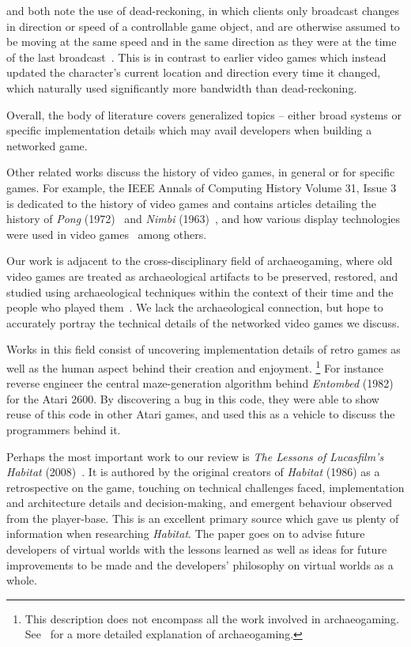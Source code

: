 \citet{Das1997NetEffect} and \citet{Blau1992NetworkedEnvironments} both note the use of dead-reckoning, in which clients only broadcast changes in direction or speed of a controllable game object, and are otherwise assumed to be moving at the same speed and in the same direction as they were at the time of the last broadcast~\cite{Blau1992NetworkedEnvironments}. This is in contrast to earlier video games which instead updated the character's current location and direction every time it changed, which naturally used significantly more bandwidth than dead-reckoning.

Overall, the body of literature covers generalized topics -- either broad systems or specific implementation details which may avail developers when building a networked game.

Other related works discuss the history of video games, in general or for specific games. For example, the IEEE Annals of Computing History Volume 31, Issue 3 is dedicated to the history of video games and contains articles detailing the history of \textit{Pong} (1972)~\cite{lowood} and \textit{Nimbi} (1963)~\cite{jorgensen}, and how various display technologies were used in video games~\cite{bogost} among others.

Our work is adjacent to the cross-disciplinary field of archaeogaming, where old video games are treated as archaeological artifacts to be preserved, restored, and studied using archaeological techniques within the context of their time and the people who played them~\cite{aycock}. We lack the archaeological connection, but hope to accurately portray the technical details of the networked video games we discuss.

Works in this field consist of uncovering implementation details of retro games as well as the human aspect behind their creation and enjoyment.
\footnote{This description does not encompass all the work involved in archaeogaming. See~\cite{aycock} for a more detailed explanation of archaeogaming.}
For instance \citet{Aycock2018} reverse engineer the central maze-generation algorithm behind \textit{Entombed} (1982) for the Atari 2600. By discovering a bug in this code, they were able to show reuse of this code in other Atari games, and used this as a vehicle to discuss the programmers behind it.

Perhaps the most important work to our review is \textit{The Lessons of Lucasfilm's Habitat} (2008)~\cite{morningstar}. It is authored by the original creators of \textit{Habitat} (1986) as a retrospective on the game, touching on technical challenges faced, implementation and architecture details and decision-making, and emergent behaviour observed from the player-base. This is an excellent primary source which gave us plenty of information when researching \textit{Habitat}. The paper goes on to advise future developers of virtual worlds with the lessons learned as well as ideas for future improvements to be made and the developers' philosophy on virtual worlds as a whole.
